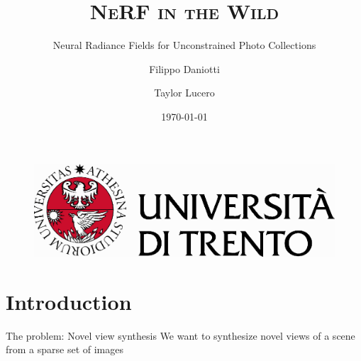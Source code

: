 \documentclass[aspectratio=1610]{beamer}
\author[Daniotti \and Lucero]{Filippo Daniotti \and Taylor Lucero}
\title[NeRF-W]{\textsc{NeRF in the Wild}}
\subtitle{Neural Radiance Fields for Unconstrained Photo Collections}
\institute[DISI - UniTN]{Department of Information Engineering\\and Computer Science}
\date{\today}
\begin{document}
\begin{frame}
    \titlepage
    \begin{figure}[H]
        \begin{center}
            \includegraphics[width=0.4\linewidth]{marchio_unitrento_colore_it_202002.eps}
        \end{center}
    \end{figure}
\end{frame}


\begin{frame}
    \tableofcontents[sectionstyle=show,subsectionstyle=show,subsubsectionstyle=show/shaded/hide]
\end{frame}

\section{Introduction}

\begin{frame}{The problem: Novel view synthesis}
    We want to synthesize novel views of a scene from a sparse set of images  
    \begin{figure}[H]
    \end{figure}
\end{frame}

    
\end{document}
